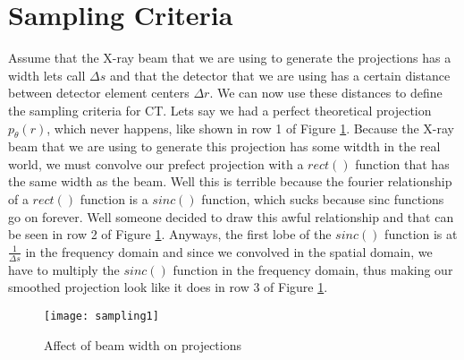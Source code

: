 \section{Sampling Criteria}
Assume that the X-ray beam that we are using to generate the projections has a width lets call $\Delta s$ and that the detector that we are using has a certain distance between detector element centers $\Delta r$.  We can now use these distances to define the sampling criteria for CT. Lets say we had a perfect theoretical projection $p_{\theta}(r)$, which never happens, like shown in row 1 of Figure \ref{fig:ct:samp1}. Because the X-ray beam that we are using to generate this projection has some witdth in the real world, we must convolve our prefect projection with a $rect()$ function that has the same width as the beam. Well this is terrible because the fourier relationship of a $rect()$ function is a $sinc()$ function, which sucks because sinc functions go on forever. Well someone decided to draw this awful relationship and that can be seen in row 2 of Figure \ref{fig:ct:samp1}. Anyways, the first lobe of the $sinc()$ function is at $\frac{1}{\Delta s}$ in the frequency domain and since we convolved in the spatial domain, we have to multiply the $sinc()$ function in the frequency domain, thus making our smoothed projection look like it does in row 3 of Figure \ref{fig:ct:samp1}.

\begin{figure}[h]
	\centering
	\texttt{[image: sampling1]}
	\caption{Affect of beam width on projections}
	\label{fig:ct:samp1}
\end{figure}

